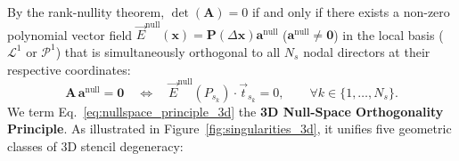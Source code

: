 \documentclass[preprint,12pt]{elsarticle}
\begin{document}
By the rank-nullity theorem, $\det(\mathbf{A}) = 0$ if and only if there exists a non-zero polynomial vector field $\vec{E}^{\text{null}}(\mathbf{x}) = \mathbf{P}(\Delta\mathbf{x})\mathbf{a}^{\text{null}}$ ($\mathbf{a}^{\text{null}} \neq \mathbf{0}$) in the local basis ($\mathcal{L}^1$ or $\mathcal{P}^1$) that is simultaneously orthogonal to all $N_s$ nodal directors at their respective coordinates:
\begin{equation}
    \mathbf{A}\,\mathbf{a}^{\text{null}} = \mathbf{0} \quad \Longleftrightarrow \quad \vec{E}^{\text{null}}(P_{s_k}) \cdot \vec{t}_{s_k} = 0, \qquad \forall k \in \{1, \dots, N_s\}.
    \label{eq:nullspace_principle_3d}
\end{equation}
We term Eq.~\eqref{eq:nullspace_principle_3d} the \textbf{3D Null-Space Orthogonality Principle}. As illustrated in Figure~\ref{fig:singularities_3d}, it unifies five geometric classes of 3D stencil degeneracy:
\end{document}
